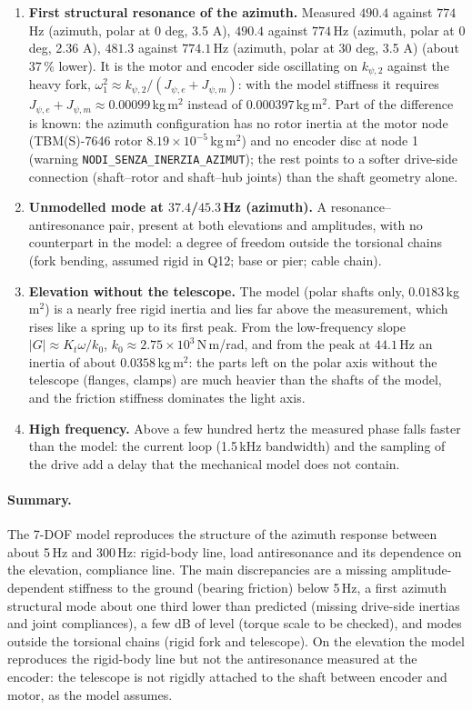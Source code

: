 \documentclass[10pt,a4paper]{article}
\numberwithin{equation}{section}
\begin{document}
\begin{enumerate}
\item \textbf{First structural resonance of the azimuth.} Measured $490.4$ against $774$\,Hz (azimuth, polar at 0 deg, 3.5 A), $490.4$ against $774$\,Hz (azimuth, polar at 0 deg, 2.36 A), $481.3$ against $774.1$\,Hz (azimuth, polar at 30 deg, 3.5 A) (about $37\,\%$ lower). It is the motor and encoder side oscillating on $k_{\psi,2}$ against the heavy fork, $\omega_1^2\approx k_{\psi,2}/(J_{\psi,e} + J_{\psi,m})$: with the model stiffness it requires $J_{\psi,e} + J_{\psi,m} \approx 0.00099$\,kg\,m$^2$ instead of $0.000397$\,kg\,m$^2$. Part of the difference is known: the azimuth configuration has no rotor inertia at the motor node (TBM(S)-7646 rotor $8.19\times10^{-5}$\,kg\,m$^2$) and no encoder disc at node 1 (warning \texttt{NODI\_SENZA\_INERZIA\_AZIMUT}); the rest points to a softer drive-side connection (shaft--rotor and shaft--hub joints) than the shaft geometry alone.
\item \textbf{Unmodelled mode at $37.4$/$45.3$\,Hz (azimuth).} A resonance--antiresonance pair, present at both elevations and amplitudes, with no counterpart in the model: a degree of freedom outside the torsional chains (fork bending, assumed rigid in Q12; base or pier; cable chain).
\item \textbf{Elevation without the telescope.} The model (polar shafts only, $0.0183$\,kg\,m$^2$) is a nearly free rigid inertia and lies far above the measurement, which rises like a spring up to its first peak. From the low-frequency slope $|G| \approx K_t\omega/k_0$, $k_0 \approx 2.75\times10^{3}$\,N\,m/rad, and from the peak at $44.1$\,Hz an inertia of about $0.0358$\,kg\,m$^2$: the parts left on the polar axis without the telescope (flanges, clamps) are much heavier than the shafts of the model, and the friction stiffness dominates the light axis.
\item \textbf{High frequency.} Above a few hundred hertz the measured phase falls faster than the model: the current loop (1.5\,kHz bandwidth) and the sampling of the drive add a delay that the mechanical model does not contain.
\end{enumerate}

\paragraph{Summary.} The 7-DOF model reproduces the structure of the azimuth response between about 5\,Hz and 300\,Hz: rigid-body line, load antiresonance and its dependence on the elevation, compliance line. The main discrepancies are a missing amplitude-dependent stiffness to the ground (bearing friction) below 5\,Hz, a first azimuth structural mode about one third lower than predicted (missing drive-side inertias and joint compliances), a few dB of level (torque scale to be checked), and modes outside the torsional chains (rigid fork and telescope). On the elevation the model reproduces the rigid-body line but not the antiresonance measured at the encoder: the telescope is not rigidly attached to the shaft between encoder and motor, as the model assumes.
\end{document}
